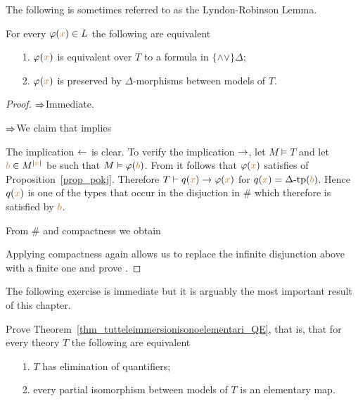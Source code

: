 The following is sometimes referred to as the Lyndon-Robinson Lemma.

\begin{lemma}\label{lem_qfdefinability}
For every $\varphi({\color{brown} x})\in L$ the following are equivalent
\begin{itemize}
\item[1.] $\varphi({\color{brown} x})$ is equivalent over $T$ to a formula in $\{\mathord\wedge\mathord\vee\}\Delta$;
\item[2.] $\varphi({\color{brown} x})$ is preserved by $\Delta$-morphisms between models of $T$.
\end{itemize}
\end{lemma}
\begin{proof} $\Rightarrow$\quad Immediate.

$\Rightarrow$\quad  We claim that  implies


The implication $\leftarrow$ is clear.
To verify the implication $\rightarrow$, let $M\models T$ and let ${\color{brown} b}\in M^{|{\color{brown} x}|}$ be such that $M\vDash\varphi({\color{brown} b})$.
From  it follows that $\varphi({\color{brown} x})$ satisfies  of Proposition~\ref{prop_pokj}.
Therefore $T\vdash q({\color{brown} x})\rightarrow\varphi({\color{brown} x})$ for $q({\color{brown} x})=\Delta\mbox{\rm -tp}({\color{brown} b})$.
Hence $q({\color{brown} x})$ is one of the types that occur in the disjuction in $\#$ which therefore is satisfied by ${\color{brown} b}$.

From $\#$ and compactness we obtain


Applying compactness again allows us to replace the infinite disjunction above with a finite one and prove .
\end{proof}

The following exercise is immediate but it is arguably the most important result of this chapter. 

\begin{exercise}\label{ex_prove_thm_EQ}
Prove Theorem~\ref{thm_tutteleimmersionisonoelementari_QE}, that is, that for every theory $T$ the following are equivalent
\begin{itemize}
\item[1.] $T$ has elimination of quantifiers;
\item[2.] every partial isomorphism between models of $T$ is an elementary map.\QED
\end{itemize}
\end{exercise}

